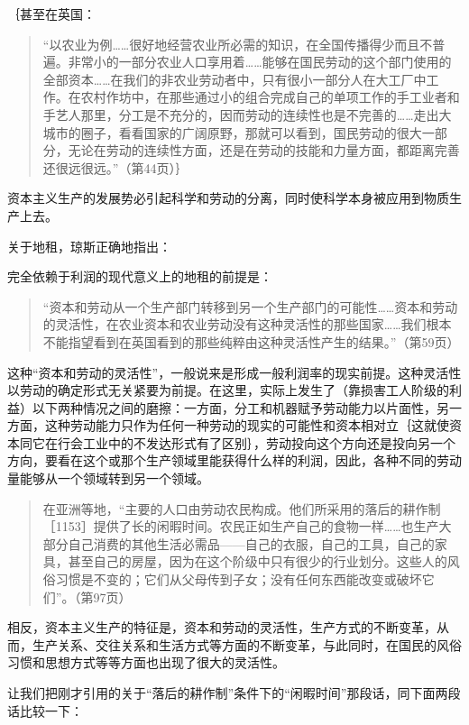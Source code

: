 ｛甚至在英国：

\begin{quote}{“以农业为例……很好地经营农业所必需的知识，在全国传播得少而且不普遍。非常小的一部分农业人口享用着……能够在国民劳动的这个部门使用的全部资本……在我们的非农业劳动者中，只有很小一部分人在大工厂中工作。在农村作坊中，在那些通过小的组合完成自己的单项工作的手工业者和手艺人那里，分工是不充分的，因而劳动的连续性也是不完善的……走出大城市的圈子，看看国家的广阔原野，那就可以看到，国民劳动的很大一部分，无论在劳动的连续性方面，还是在劳动的技能和力量方面，都距离完善还很远很远。”（第44页）｝}\end{quote}

资本主义生产的发展势必引起科学和劳动的分离，同时使科学本身被应用到物质生产上去。


关于地租，琼斯正确地指出：

完全依赖于利润的现代意义上的地租的前提是：

\begin{quote}{“资本和劳动从一个生产部门转移到另一个生产部门的可能性……资本和劳动的灵活性，在农业资本和农业劳动没有这种灵活性的那些国家……我们根本不能指望看到在英国看到的那些纯粹由这种灵活性产生的结果。”（第59页）}\end{quote}

这种“资本和劳动的灵活性”，一般说来是形成一般利润率的现实前提。这种灵活性以劳动的确定形式无关紧要为前提。在这里，实际上发生了（靠损害工人阶级的利益）以下两种情况之间的磨擦：一方面，分工和机器赋予劳动能力以片面性，另一方面，这种劳动能力只作为任何一种劳动的现实的可能性和资本相对立｛这就使资本同它在行会工业中的不发达形式有了区别｝，劳动投向这个方向还是投向另一个方向，要看在这个或那个生产领域里能获得什么样的利润，因此，各种不同的劳动量能够从一个领域转到另一个领域。

\begin{quote}{在亚洲等地，“主要的人口由劳动农民构成。他们所采用的落后的耕作制［1153］提供了长的闲暇时间。农民正如生产自己的食物一样……也生产大部分自己消费的其他生活必需品——自己的衣服，自己的工具，自己的家具，甚至自己的房屋，因为在这个阶级中只有很少的行业划分。这些人的风俗习惯是不变的；它们从父母传到子女；没有任何东西能改变或破坏它们”。（第97页）}\end{quote}

相反，资本主义生产的特征是，资本和劳动的灵活性，生产方式的不断变革，从而，生产关系、交往关系和生活方式等方面的不断变革，与此同时，在国民的风俗习惯和思想方式等等方面也出现了很大的灵活性。

让我们把刚才引用的关于“落后的耕作制”条件下的“闲暇时间”那段话，同下面两段话比较一下：


